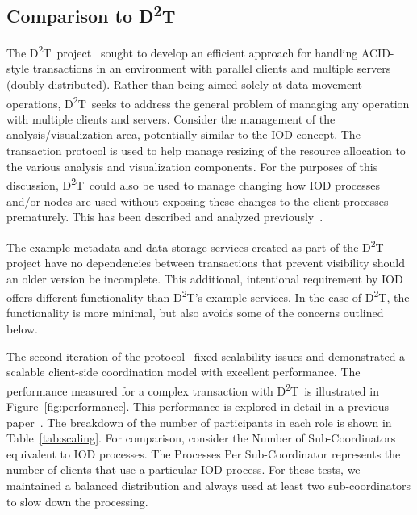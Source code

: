 \documentclass[conference]{IEEEtran}
\newcommand{\DDT}{D\textsuperscript{2}T~}
\newcommand{\DDTns}{D\textsuperscript{2}T}
\begin{document}
\subsection{Comparison to \DDTns}
The \DDT project~\cite{lofstead:2012:txn} sought to develop an efficient
approach for handling ACID-style transactions in an environment with parallel
clients and multiple servers (doubly distributed). Rather than being aimed
solely at data movement operations, \DDT seeks to address the general problem
of managing any operation with multiple clients and servers.  Consider the
management of the analysis/visualization area, potentially similar to the IOD
concept. The transaction protocol is used to help manage resizing of the
resource allocation to the various analysis and visualization components.  For
the purposes of this discussion, \DDT could also be used to manage changing how
IOD processes and/or nodes are used without exposing these changes to the
client processes prematurely.  This has been described and analyzed
previously~\cite{dayal:2013:io-containers}.

The example metadata and data storage services created as part of the \DDT
project have no dependencies between transactions that prevent visibility
should an older version be incomplete. This additional, intentional requirement
by IOD offers different functionality than \DDTns's example services. In the
case of \DDTns, the functionality is more minimal, but also avoids some of the
concerns outlined below.

The second iteration of the protocol~\cite{lofstead:2013:pdsw-txn} fixed
scalability issues and demonstrated a scalable client-side coordination model
with excellent performance. The performance measured for a complex transaction
with \DDT is illustrated in Figure~\ref{fig:performance}. This performance is
explored in detail in a previous paper~\cite{lofstead:2013:pdsw-txn}. The
breakdown of the number of participants in each role is shown in
Table~\ref{tab:scaling}. For comparison, consider the Number of
Sub-Coordinators equivalent to IOD processes. The Processes Per Sub-Coordinator
represents the number of clients that use a particular IOD process. For these
tests, we maintained a balanced distribution and always used at least two
sub-coordinators to slow down the processing.
\end{document}
